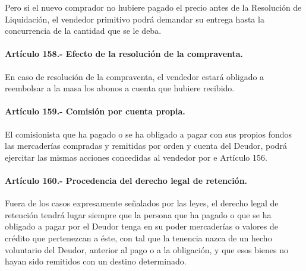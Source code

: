 \documentclass[
]{book}
\begin{document}
Pero si el nuevo comprador no hubiere pagado el precio antes de la Resolución de Liquidación, el vendedor primitivo podrá demandar su entrega hasta la concurrencia de la cantidad que se le deba.

\hypertarget{artuxedculo-158.--efecto-de-la-resoluciuxf3n-de-la-compraventa.}{%
\paragraph*{Artículo 158.- Efecto de la resolución de la compraventa.}\label{artuxedculo-158.--efecto-de-la-resoluciuxf3n-de-la-compraventa.}}

En caso de resolución de la compraventa, el vendedor estará obligado a reembolsar a la masa los abonos a cuenta que hubiere recibido.

\hypertarget{artuxedculo-159.--comisiuxf3n-por-cuenta-propia.}{%
\paragraph*{Artículo 159.- Comisión por cuenta propia.}\label{artuxedculo-159.--comisiuxf3n-por-cuenta-propia.}}

El comisionista que ha pagado o se ha obligado a pagar con sus propios fondos las mercaderías compradas y remitidas por orden y cuenta del Deudor, podrá ejercitar las mismas acciones concedidas al vendedor por e Artículo 156.

\hypertarget{artuxedculo-160.--procedencia-del-derecho-legal-de-retenciuxf3n.}{%
\paragraph*{Artículo 160.- Procedencia del derecho legal de retención.}\label{artuxedculo-160.--procedencia-del-derecho-legal-de-retenciuxf3n.}}

Fuera de los casos expresamente señalados por las leyes, el derecho legal de retención tendrá lugar siempre que la persona que ha pagado o que se ha obligado a pagar por el Deudor tenga en su poder mercaderías o valores de crédito que pertenezcan a éste, con tal que la tenencia nazca de un hecho voluntario del Deudor, anterior al pago o a la obligación, y que esos bienes no hayan sido remitidos con un destino determinado.
\end{document}
